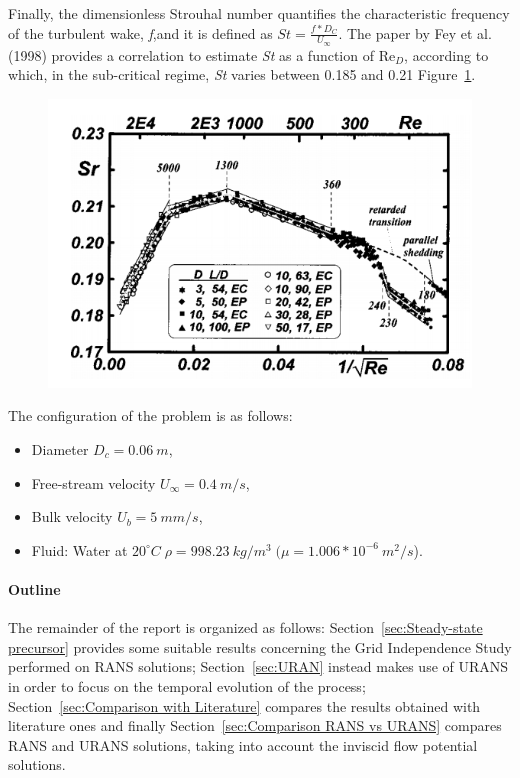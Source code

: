 \documentclass[12pt]{article}
\begin{document}
        Finally, the dimensionless Strouhal number quantifies the characteristic frequency of the turbulent wake, \textit{f},and it is defined as $St = \frac{f*D_C}{U_\infty}$. The paper by Fey et al. (1998) provides a correlation to estimate \textit{St} as a function of $\text{Re}_D$, according to which, in the sub-critical regime, \textit{St} varies between 0.185 and 0.21 Figure~\ref{fig:strouhal}.


 \begin{figure}[!ht]
                \includegraphics[width=\textwidth]{Strouhal.png}
                \centering
                \caption{}
                \label{fig:strouhal}
        \end{figure}


        The configuration of the problem is as follows:
        \begin{itemize}
                \item Diameter \( D_c = 0.06 \: m \),
                \item Free-stream velocity \( U_\infty = 0.4 \: m/s \),
                \item Bulk velocity \( U_b = 5 \: mm/s \),
                \item Fluid: Water at \( 20^{\circ}C \; \rho = 998.23 \: kg/m^3\;( \mu=1.006*10^{-6} \:m^2/s\)).
        \end{itemize}


        \paragraph{Outline}
        The remainder of the report is organized as follows: Section~\ref{sec:Steady-state precursor} provides some suitable results concerning the Grid Independence Study performed on RANS solutions; Section~\ref{sec:URAN} instead makes use of URANS in order to focus on the temporal evolution  of the process; Section~\ref{sec:Comparison with Literature} compares the results obtained with literature ones and finally  Section~\ref{sec:Comparison RANS vs URANS} compares RANS and URANS solutions, taking into account the inviscid flow potential solutions.
      
\end{document}

